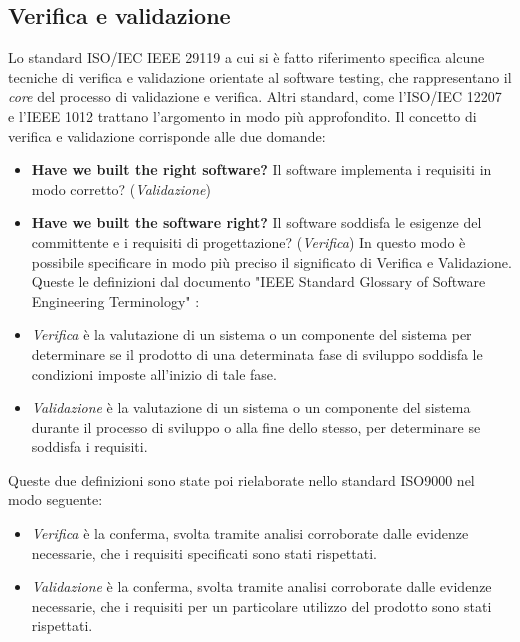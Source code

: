 \documentclass[../main.tex]{subfiles}
\begin{document}
\subsection{Verifica e validazione}

Lo standard ISO/IEC IEEE 29119 \cite{iso29119} a cui si è fatto riferimento specifica alcune tecniche di verifica e validazione orientate al software testing, che rappresentano il \textit{core} del processo di validazione e verifica. Altri standard, come l'ISO/IEC 12207 \cite{iso12207} e l'IEEE 1012 \cite{ieee1012} trattano l'argomento in modo più approfondito.
Il concetto di verifica e validazione corrisponde alle due domande:
\begin{itemize}
\item \textbf{Have we built the right software?} Il software implementa i requisiti in modo corretto? (\textit{Validazione})
\item \textbf{Have we built the software right?} Il software soddisfa le esigenze del committente e i requisiti di progettazione? (\textit{Verifica})
In questo modo è possibile specificare in modo più preciso il significato di Verifica e Validazione.
Queste le definizioni dal documento "IEEE Standard Glossary of Software Engineering Terminology" \cite{NistGlossary}:
\end{itemize}
\begin{itemize}
\item \textit{Verifica} è la valutazione di un sistema o un componente del sistema per determinare se il prodotto di una determinata fase di sviluppo soddisfa le condizioni imposte all'inizio di tale fase.
\item \textit{Validazione} è la valutazione di un sistema o un componente del sistema durante il processo di sviluppo o alla fine dello stesso, per determinare se soddisfa i requisiti.
\end{itemize}
Queste due definizioni sono state poi rielaborate nello standard ISO9000 \cite{iso9000} nel modo seguente:
\begin{itemize}
\item \textit{Verifica} è la conferma, svolta tramite analisi corroborate dalle evidenze necessarie, che i requisiti specificati sono stati rispettati.
\item \textit{Validazione} è la conferma, svolta tramite analisi corroborate dalle evidenze necessarie, che i requisiti per un particolare utilizzo del prodotto sono stati rispettati.
\end{itemize}
\end{document}
